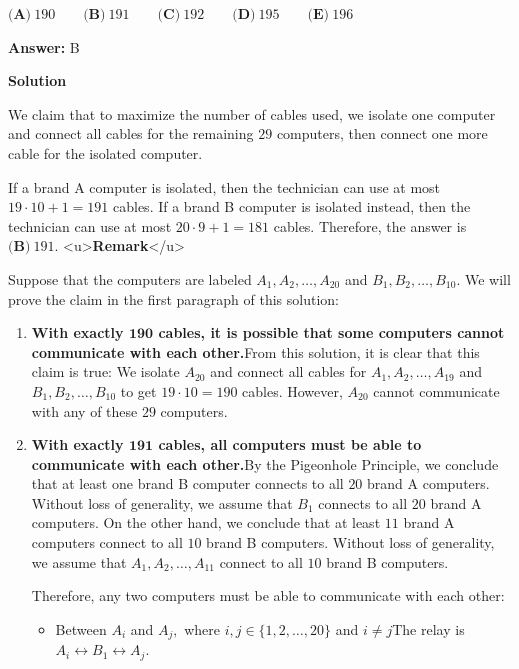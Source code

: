 \begin{enumerate}
 $\textbf{(A)}\ 190  \qquad\textbf{(B)}\  191 \qquad\textbf{(C)}\  192 \qquad\textbf{(D)}\  195 \qquad\textbf{(E)}\ 196$

 \textbf{Answer: }B



\textbf{Solution}

We claim that to maximize the number of cables used, we isolate one computer and connect all cables for the remaining $29$ computers, then connect one more cable for the isolated computer.

 If a brand A computer is isolated, then the technician can use at most $19\cdot10+1=191$ cables. If a brand B computer is isolated instead, then the technician can use at most $20\cdot9+1=181$ cables. Therefore, the answer is $\boxed{\textbf{(B)}\  191}.$
<u>\textbf{Remark}</u>

 Suppose that the computers are labeled $A_1, A_2, \ldots, A_{20}$ and $B_1, B_2, \ldots, B_{10}.$ We will prove the claim in the first paragraph of this solution:

 
            \begin{enumerate} 
        \item \textbf{With exactly $\boldsymbol{190}$ cables, it is possible that some computers cannot communicate with each other.}From this solution, it is clear that this claim is true: We isolate $A_{20}$ and connect all cables for $A_1, A_2, \ldots, A_{19}$ and $B_1, B_2, \ldots, B_{10}$ to get $19\cdot10=190$ cables. However, $A_{20}$ cannot communicate with any of these $29$ computers. 

  

 
        \item \textbf{With exactly $\boldsymbol{191}$ cables, all computers must be able to communicate with each other.}By the Pigeonhole Principle, we conclude that at least one brand B computer connects to all $20$ brand A computers. Without loss of generality, we assume that $B_1$ connects to all $20$ brand A computers. On the other hand, we conclude that at least $11$ brand A computers connect to all $10$ brand B computers. Without loss of generality, we assume that $A_1, A_2, \ldots, A_{11}$ connect to all $10$ brand B computers. 

 Therefore, any two computers must be able to communicate with each other:

 
            \begin{itemize} 
        \item Between $A_i$ and $A_j,$ where $i,j\in\{1,2,\ldots,20\}$ and $i\neq j$The relay is $A_i\leftrightarrow B_1\leftrightarrow A_j.$


\end{itemize}
\end{enumerate}
\end{enumerate}
